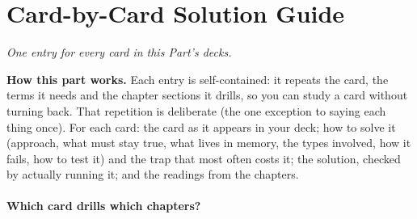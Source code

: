 \documentclass[10pt]{article}
\newcommand{\partq}[2]{\part*{#1}{\small\itshape #2}}
\newcommand{\partline}[2]{\phantomsection\partq{#1}{#2}}  %
\begin{document}
\newpage{}\partline{Card-by-Card Solution Guide}{One entry for every card in this Part's decks.}
\begin{corebox}\textbf{How this part works.} Each entry is self-contained: it repeats the card, the terms it needs and the chapter sections it drills, so you can study a card without turning back. That repetition is deliberate (the one exception to saying each thing once). For each card: the card as it appears in your deck; how to solve it (approach, what must stay true, what lives in memory, the types involved, how it fails, how to test it) and the trap that most often costs it; the solution, checked by actually running it; and the readings from the chapters.\end{corebox}
\subsection*{Which card drills which chapters?}
\end{document}
